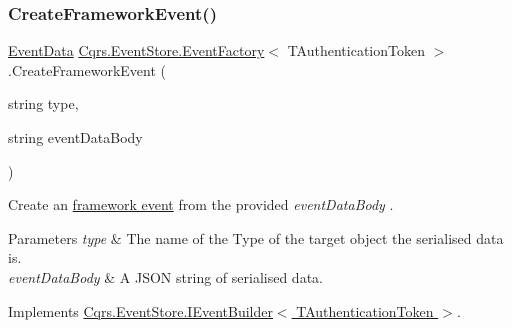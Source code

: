 \mbox{\label{classCqrs_1_1EventStore_1_1EventFactory_a9e04e262a8af8f60bdde7b4bf3eafebb_a9e04e262a8af8f60bdde7b4bf3eafebb}} 
\subsubsection{\texorpdfstring{Create\+Framework\+Event()}{CreateFrameworkEvent()}\hspace{0.1cm}{\footnotesize\ttfamily [4/4]}}
{\footnotesize\ttfamily \hyperlink{classCqrs_1_1Events_1_1EventData}{Event\+Data} \hyperlink{classCqrs_1_1EventStore_1_1EventFactory}{Cqrs.\+Event\+Store.\+Event\+Factory}$<$ T\+Authentication\+Token $>$.Create\+Framework\+Event (\begin{DoxyParamCaption}\item[{string}]{type,  }\item[{string}]{event\+Data\+Body }\end{DoxyParamCaption})}



Create an \hyperlink{}{framework event} from the provided {\itshape event\+Data\+Body} . 


\begin{DoxyParams}{Parameters}
{\em type} & The name of the Type of the target object the serialised data is.\\
\hline
{\em event\+Data\+Body} & A J\+S\+ON string of serialised data.\\
\hline
\end{DoxyParams}


Implements \hyperlink{interfaceCqrs_1_1EventStore_1_1IEventBuilder_a8e3df7af1f54ac873d1a768b78b82c6d_a8e3df7af1f54ac873d1a768b78b82c6d}{Cqrs.\+Event\+Store.\+I\+Event\+Builder$<$ T\+Authentication\+Token $>$}.

\mbox{\label{classCqrs_1_1EventStore_1_1EventFactory_abfd04f6833e4f010234d84a591f6eb6b_abfd04f6833e4f010234d84a591f6eb6b}} 
